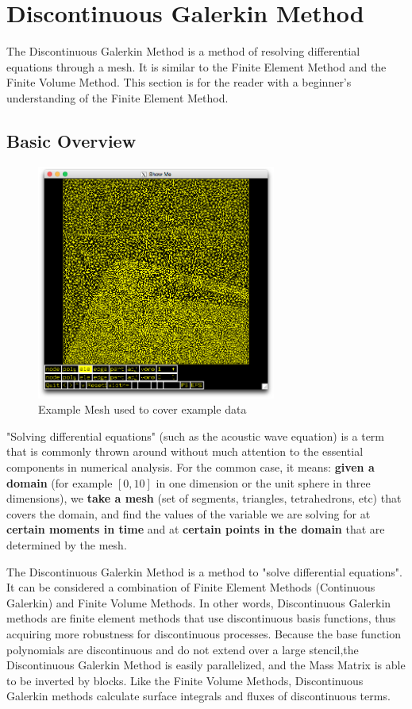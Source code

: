 \newpage
\section{Discontinuous Galerkin Method}

The Discontinuous Galerkin Method is a method of resolving differential equations through a mesh. It is similar to the Finite Element Method and the Finite Volume Method. This section is for the reader with a beginner's understanding of the Finite Element Method.

\subsection{Basic Overview}


\begin{figure}[ht]
\centering
\includegraphics[width=0.7\textwidth]{Images/Example-Mesh.png}
\caption{Example Mesh used to cover example data}
\label{fig:couches5-mesh}
\end{figure}

"Solving differential equations" (such as the acoustic wave equation) is a term that is commonly thrown around without much attention to the essential components in numerical analysis. For the common case, it means: \textbf{given a domain} (for example $[0,10]$ in one dimension or the unit sphere in three dimensions), we \textbf{take a mesh} (set of segments, triangles, tetrahedrons, etc) that covers the domain, and find the values of the variable we are solving for at \textbf{certain moments in time} and at \textbf{certain points in the domain} that are determined by the mesh.

The Discontinuous Galerkin Method is a method to "solve differential equations". It can be considered a combination of Finite Element Methods (Continuous Galerkin) and Finite Volume Methods. In other words, Discontinuous Galerkin methods are finite element methods that use discontinuous basis functions, thus acquiring more robustness for discontinuous processes. Because the base function polynomials are discontinuous and do not extend over a large stencil,the  Discontinuous Galerkin Method is easily parallelized, and the Mass Matrix is able to be inverted by blocks. Like the Finite Volume Methods, Discontinuous Galerkin methods calculate surface integrals and fluxes of discontinuous terms.

